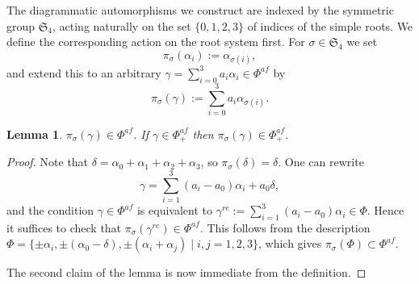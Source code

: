 \documentclass[10pt]{amsart}
\newtheorem{lemma}[theorem]{Lemma}
\begin{document}
	The diagrammatic automorphisms we construct are indexed by the symmetric group $\mathfrak S_4$, acting naturally on the set $\{0,1,2,3\}$ of indices of the simple roots. We define the corresponding action on the root system first. For $\sigma \in \mathfrak S_4$ we set
	\[\pi_\sigma(\alpha_i):=\alpha_{\sigma(i)},\]
	and extend this to an arbitrary $\gamma=\sum_{i=0}^3a_i\alpha_i \in \Phi^{af}$ by
	\begin{equation*}\label{eq:AutomorphismOnRoot}
		\pi_\sigma(\gamma):=\sum_{i=0}^3a_i\alpha_{\sigma(i)}.
	\end{equation*}
	
	\begin{lemma}
		$\pi_\sigma(\gamma)\in \Phi^{af}$. If $\gamma \in \Phi^{af}_+$ then $\pi_\sigma(\gamma)\in \Phi^{af}_+$.
	\end{lemma}
	\begin{proof}
		Note that $\delta=\alpha_0+\alpha_1+\alpha_2+\alpha_3$, so $\pi_\sigma(\delta)=\delta$. One can rewrite
		\[\gamma=\sum_{i=1}^3(a_i-a_0)\alpha_i+a_0 \delta,\]
		and the condition $\gamma \in \Phi^{af}$ is equivalent to $\gamma^{re}:=\sum_{i=1}^3(a_i-a_0)\alpha_i \in \Phi.$
		Hence it suffices to check that $\pi_\sigma(\gamma^{re}) \in \Phi^{af}$. This follows from the description $\Phi=\{\pm \alpha_i, \pm (\alpha_0-\delta),\pm (\alpha_i +\alpha_j)\mid i,j=1,2,3\}$, which gives $\pi_\sigma(\Phi) \subset \Phi^{af}$.
		
		The second claim of the lemma is now immediate from the definition.
	\end{proof}
	
\end{document}
